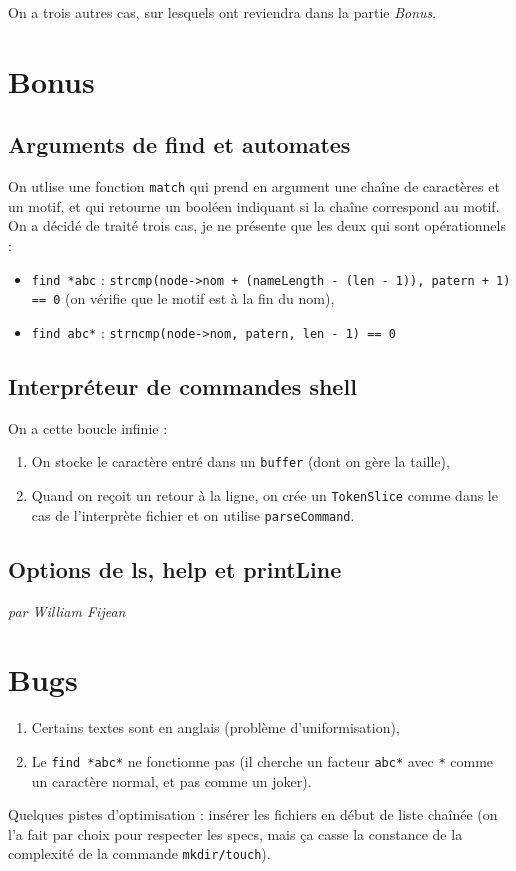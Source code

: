 \documentclass{article}
\begin{document}
On a trois autres cas, sur lesquels ont reviendra dans la partie \textit{Bonus}.

\section{Bonus}


\subsection{Arguments de find et automates}

On utlise une fonction \texttt{match} qui prend en argument une chaîne de caractères et un motif, et qui retourne un booléen indiquant si la chaîne correspond au motif.\\
On a décidé de traité trois cas, je ne présente que les deux qui sont opérationnels :
\begin{itemize}
    \item \texttt{find *abc} : \texttt{strcmp(node->nom + (nameLength - (len - 1)), patern + 1) == 0} (on vérifie que le motif est à la fin du nom),
    \item \texttt{find abc*} : \texttt{strncmp(node->nom, patern, len - 1) == 0}
\end{itemize}

\subsection{Interpréteur de commandes shell}

On a cette boucle infinie :
\begin{enumerate}
    \item On stocke le caractère entré dans un \texttt{buffer} (dont on gère la taille),
    \item Quand on reçoit un retour à la ligne, on crée un \texttt{TokenSlice} comme dans le cas de l'interprète fichier et on utilise \texttt{parseCommand}.
\end{enumerate}

\subsection{Options de ls, help et printLine}
\textit{par William Fijean}

\section{Bugs}
\begin{enumerate}
    \item Certains textes sont en anglais (problème d'uniformisation),
    \item Le \texttt{find *abc*} ne fonctionne pas (il cherche un facteur \texttt{abc*} avec \texttt{*} comme un caractère normal, et pas comme un joker).
\end{enumerate}
Quelques pistes d'optimisation : insérer les fichiers en début de liste chaînée (on l'a fait par choix pour respecter les specs, mais ça casse la constance de la complexité de la commande \texttt{mkdir/touch}).
\end{document}
